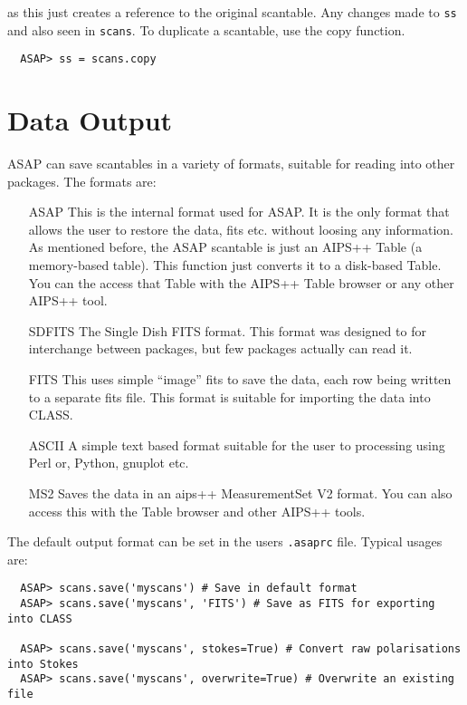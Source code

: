 \documentclass[11pt]{article}
\newcommand{\cmd}[1]{{\tt #1}}
\begin{document}
as this just creates a reference to the original scantable. Any changes
made to \cmd{ss} and also seen in \cmd{scans}. To duplicate a
scantable, use the copy function.

\begin{verbatim}
  ASAP> ss = scans.copy
\end{verbatim}

\section{Data Output}

ASAP can save scantables in a variety of formats, suitable for reading
into other packages. The formats are:

\begin{itemize}
\item[ASAP] This is the internal format used for ASAP. It is the only
format that allows the user to restore the data, fits etc. without
loosing any information.   As mentioned before, the ASAP scantable 
is just an AIPS++ Table (a memory-based table).
This function just converts it to a  disk-based
Table.  You can the access that Table with the AIPS++ Table browser
or any other AIPS++ tool.

\item[SDFITS] The Single Dish FITS format. This format was
designed to for interchange between packages, but few packages
actually can read it.

\item[FITS] This uses simple ``image'' fits to save the data, each row
being written to a separate fits file. This format is suitable for
importing the data into CLASS.

\item[ASCII] A simple text based format suitable for the user to
processing using Perl or, Python, gnuplot etc.

\item[MS2] Saves the data in an aips++ MeasurementSet V2 format.
You can also access this with the Table browser and other AIPS++
tools.

\end{itemize}

The default output format can be set in the users {\tt .asaprc} file. 
Typical usages are:

\begin{verbatim}
  ASAP> scans.save('myscans') # Save in default format
  ASAP> scans.save('myscans', 'FITS') # Save as FITS for exporting into CLASS

  ASAP> scans.save('myscans', stokes=True) # Convert raw polarisations into Stokes
  ASAP> scans.save('myscans', overwrite=True) # Overwrite an existing file
\end{verbatim}
\end{document}
